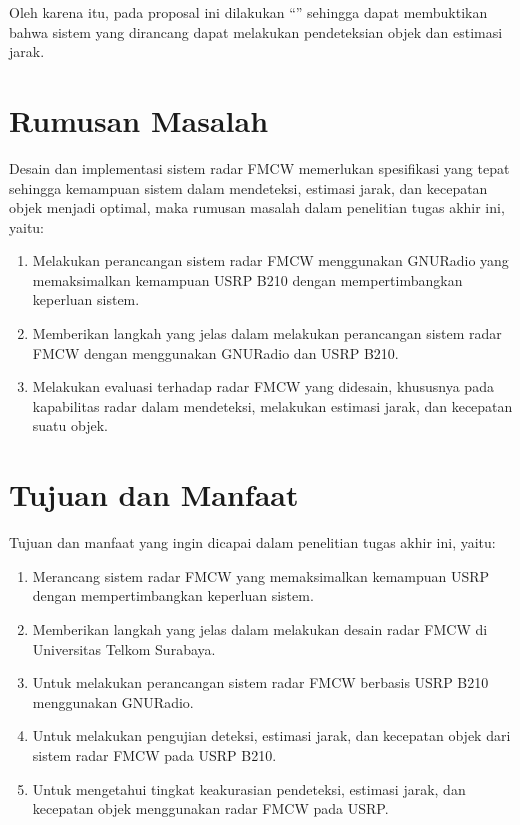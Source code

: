 Oleh karena itu, pada proposal ini dilakukan “\judul” sehingga dapat membuktikan bahwa sistem yang dirancang dapat melakukan pendeteksian objek dan estimasi jarak.

\section{Rumusan Masalah}
Desain dan implementasi sistem radar FMCW memerlukan spesifikasi yang tepat sehingga kemampuan sistem dalam mendeteksi, estimasi jarak, dan kecepatan objek menjadi optimal, maka rumusan masalah dalam penelitian tugas akhir ini, yaitu:
\begin{enumerate}
	\item Melakukan perancangan sistem radar FMCW menggunakan GNURadio yang memaksimalkan kemampuan USRP B210 dengan mempertimbangkan keperluan sistem.
	\item Memberikan langkah yang jelas dalam melakukan perancangan sistem radar FMCW dengan menggunakan GNURadio dan USRP B210.
	\item Melakukan evaluasi terhadap radar FMCW yang didesain, khususnya pada kapabilitas radar dalam mendeteksi, melakukan estimasi jarak, dan kecepatan suatu objek.
\end{enumerate} 

\section{Tujuan dan Manfaat}
Tujuan dan manfaat yang ingin dicapai dalam penelitian tugas akhir ini, yaitu:

\begin{enumerate}
	\item Merancang sistem radar FMCW yang memaksimalkan kemampuan USRP dengan mempertimbangkan keperluan sistem.
	\item Memberikan langkah yang jelas dalam melakukan desain radar FMCW di Universitas Telkom Surabaya.
	\item Untuk melakukan perancangan sistem radar FMCW berbasis USRP B210 menggunakan GNURadio.
	\item Untuk melakukan pengujian deteksi, estimasi jarak, dan kecepatan objek dari sistem radar FMCW pada USRP B210.
	\item Untuk mengetahui tingkat keakurasian pendeteksi, estimasi jarak, dan kecepatan objek menggunakan radar FMCW pada USRP.
\end{enumerate}

